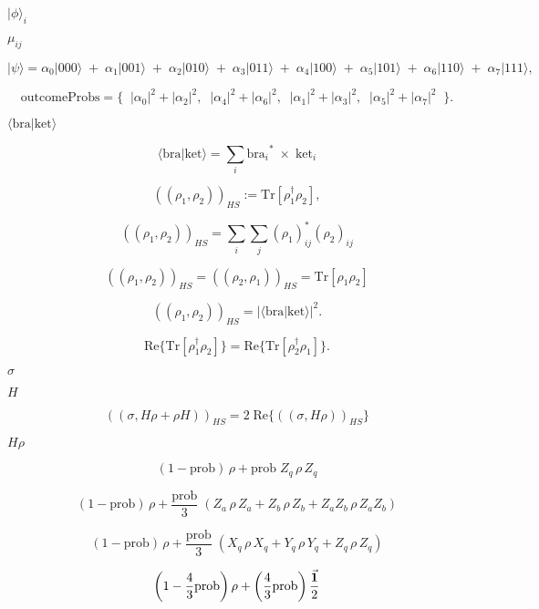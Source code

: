 \documentclass{article}
\begin{document}
$|\phi\rangle_i$
\pagebreak

$\mu_{ij}$
\pagebreak

\[
     |\psi\rangle = 
         \alpha_0 |000\rangle \;+\; \alpha_1 |001\rangle \;+\; 
         \alpha_2 |010\rangle \;+\; \alpha_3 |011\rangle \;+\;
         \alpha_4 |100\rangle \;+\; \alpha_5 |101\rangle \;+\; 
         \alpha_6 |110\rangle \;+\; \alpha_7 |111\rangle,
  \]
\pagebreak

\[
     \text{outcomeProbs} = \{ \;\; |\alpha_0|^2+|\alpha_2|^2, \;\; |\alpha_4|^2+|\alpha_6|^2, \;\;
                                |\alpha_1|^2+|\alpha_3|^2, \;\; |\alpha_5|^2+|\alpha_7|^2  \;\; \}.
  \]
\pagebreak

$ \langle \text{bra} | \text{ket} \rangle $
\pagebreak

\[ 
  \langle \text{bra} | \text{ket} \rangle = \sum_i {\text{bra}_i}^* \; \times \; \text{ket}_i 
\]
\pagebreak

\[
 ((\rho_1, \rho_2))_{HS} := \text{Tr}[ \rho_1^\dagger \rho_2 ],
\]
\pagebreak

\[
 ((\rho_1, \rho_2))_{HS} = \sum\limits_i \sum\limits_j  (\rho_1)_{ij}^* (\rho_2)_{ij}
\]
\pagebreak

\[
 ((\rho_1, \rho_2))_{HS} = ((\rho_2, \rho_1))_{HS} = \text{Tr}[\rho_1 \rho_2]
\]
\pagebreak

\[
 ((\rho_1, \rho_2))_{HS} = |\langle \text{bra} | \text{ket} \rangle|^2.
\]
\pagebreak

\[
  \text{Re}\{ \text{Tr}[ \rho_1^\dagger \rho_2 ] \} = \text{Re}\{ \text{Tr}[ \rho_2^\dagger \rho_1 ] \}.
\]
\pagebreak

$ \sigma $
\pagebreak

$ H $
\pagebreak

\[
     ((\sigma, H \rho + \rho H))_{HS} = 2 \; \text{Re} \{ ((\sigma, H \rho))_{HS} \} 
\]
\pagebreak

$ H \rho $
\pagebreak

\[
(1 - \text{prob}) \, \rho + \text{prob} \; Z_q \, \rho \, Z_q
\]
\pagebreak

\[
(1 - \text{prob}) \, \rho + \frac{\text{prob}}{3} \; \left( 
     Z_a \, \rho \, Z_a + 
     Z_b \, \rho \, Z_b + 
     Z_a Z_b \, \rho \, Z_a Z_b
\right)
\]
\pagebreak

\[
(1 - \text{prob}) \, \rho + \frac{\text{prob}}{3} \; \left( 
     X_q \, \rho \, X_q + 
     Y_q \, \rho \, Y_q + 
     Z_q \, \rho \, Z_q
\right)
\]
\pagebreak

\[
     \left( 1 - \frac{4}{3} \text{prob} \right) \rho +
     \left( \frac{4}{3} \text{prob} \right) \frac{\vec{\bf{1}}}{2}
\]
\pagebreak
\end{document}
